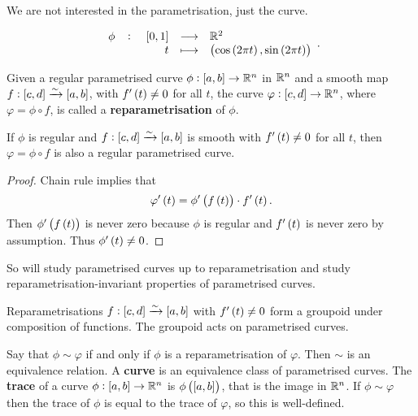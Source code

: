 We are not interested in the parametrisation, just the curve.

\begin{example*}
$$ \function[\phi]{\sbr{0, 1}}{\R^2}{t}{\br{\cos\br{2\pi t}, \sin\br{2\pi t}}}. $$
\end{example*}

\pagebreak

\begin{definition}
Given a regular parametrised curve $ \phi : \sbr{a, b} \to \R^n $ in $ \mathbb{R}^n $ and a smooth map $ f : \sbr{c, d} \xrightarrow{\sim} \sbr{a, b} $, with $ f'\br{t} \ne 0 $ for all $ t $, the curve $ \varphi : \sbr{c, d} \to \R^n $, where $ \varphi = \phi \circ f $, is called a \textbf{reparametrisation} of $ \phi $.
\end{definition}

\begin{proposition}
If $ \phi $ is regular and $ f : \sbr{c, d} \xrightarrow{\sim} \sbr{a, b} $ is smooth with $ f'\br{t} \ne 0 $ for all $ t $, then $ \varphi = \phi \circ f $ is also a regular parametrised curve.
\end{proposition}

\begin{proof}
Chain rule implies that
$$ \varphi'\br{t} = \phi'\br{f\br{t}} \cdot f'\br{t}. $$
Then $ \phi'\br{f\br{t}} $ is never zero because $ \phi $ is regular and $ f'\br{t} $ is never zero by assumption. Thus $ \phi'\br{t} \ne 0 $.
\end{proof}

So will study parametrised curves up to reparametrisation and study reparametrisation-invariant properties of parametrised curves.

\begin{remark*}
Reparametrisations $ f : \sbr{c, d} \xrightarrow{\sim} \sbr{a, b} $ with $ f'\br{t} \ne 0 $ form a groupoid under composition of functions. The groupoid acts on parametrised curves.
\end{remark*}


Say that $ \phi \sim \varphi $ if and only if $ \phi $ is a reparametrisation of $ \varphi $. Then $ \sim $ is an equivalence relation. A \textbf{curve} is an equivalence class of parametrised curves. The \textbf{trace} of a curve $ \phi : \sbr{a, b} \to \R^n $ is $ \phi\br{\sbr{a, b}} $, that is the image in $ \mathbb{R}^n $. If $ \phi \sim \varphi $ then the trace of $ \phi $ is equal to the trace of $ \varphi $, so this is well-defined.

